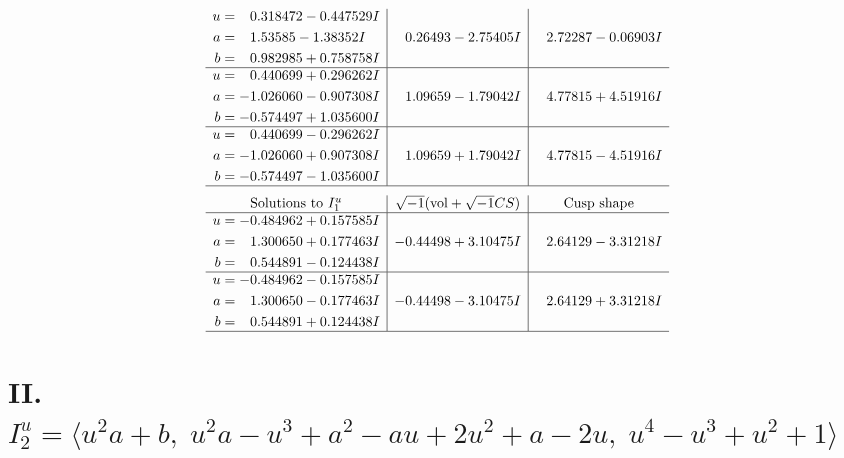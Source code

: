 \documentclass[1p]{elsarticle_modified}
\theoremstyle{definition}
\newcommand{\I}{\sqrt{-1}}
\begin{document}
$$\begin{array}{c|c|c}
\begin{aligned}
u &= \phantom{-}0.318472 - 0.447529 I \\
a &= \phantom{-}1.53585 - 1.38352 I \\
b &= \phantom{-}0.982985 + 0.758758 I\end{aligned}
 & \phantom{-}0.26493 - 2.75405 I & \phantom{-}2.72287 - 0.06903 I \\ \hline\begin{aligned}
u &= \phantom{-}0.440699 + 0.296262 I \\
a &= -1.026060 - 0.907308 I \\
b &= -0.574497 + 1.035600 I\end{aligned}
 & \phantom{-}1.09659 - 1.79042 I & \phantom{-}4.77815 + 4.51916 I \\ \hline\begin{aligned}
u &= \phantom{-}0.440699 - 0.296262 I \\
a &= -1.026060 + 0.907308 I \\
b &= -0.574497 - 1.035600 I\end{aligned}
 & \phantom{-}1.09659 + 1.79042 I & \phantom{-}4.77815 - 4.51916 I\\
 \hline 
 \end{array}$$\newpage$$\begin{array}{c|c|c}  
\text{Solutions to }I^u_{1}& \I (\text{vol} + \sqrt{-1}CS) & \text{Cusp shape}\\
 \hline 
\begin{aligned}
u &= -0.484962 + 0.157585 I \\
a &= \phantom{-}1.300650 + 0.177463 I \\
b &= \phantom{-}0.544891 - 0.124438 I\end{aligned}
 & -0.44498 + 3.10475 I & \phantom{-}2.64129 - 3.31218 I \\ \hline\begin{aligned}
u &= -0.484962 - 0.157585 I \\
a &= \phantom{-}1.300650 - 0.177463 I \\
b &= \phantom{-}0.544891 + 0.124438 I\end{aligned}
 & -0.44498 - 3.10475 I & \phantom{-}2.64129 + 3.31218 I\\
 \hline 
 \end{array}$$\newpage\newpage\renewcommand{\arraystretch}{1}
\centering \section*{II. $I^u_{2}= \langle u^2 a+b,\;u^2 a- u^3+a^2- a u+2 u^2+a-2 u,\;u^4- u^3+u^2+1 \rangle$}
\end{document}
